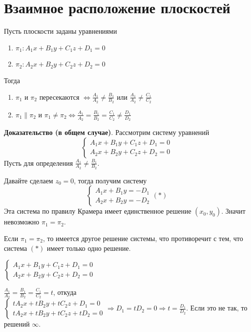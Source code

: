 \documentclass[a4paper]{article}
\begin{document}
\section*{Взаимное расположение плоскостей}
Пусть плоскости заданы уравнениями \begin{enumerate}
\item $\pi_1: A_1x+B_1y+C_1z+D_1 = 0$
\item $\pi_2: A_2x+B_2y+C_2z+D_2 = 0$
\end{enumerate}

Тогда\begin{enumerate}
\item $\pi_1$ и $\pi_2$ пересекаются $\displaystyle \Leftrightarrow \frac{A_1}{A_2} \neq \frac{B_1}{B_2}$ или $\displaystyle \frac{A_1}{A_2} \neq \frac{C_1}{C_2}$

\item $\pi_1 \parallel \pi_2$ и $\pi_1 \neq \pi_2 \Leftrightarrow \displaystyle \frac{A_1}{A_2} = \frac{B_1}{B_2} = \frac{C_1}{C_2} \neq \frac{D_1}{D_2}$
\end{enumerate}

\textbf{Доказательство (в общем случае)}. Рассмотрим систему уравнений
\begin{equation}
\begin{cases}
   A_1x+B_1y+C_1z+D_1 = 0
   \\
   A_2x+B_2y+C_2z+D_2 = 0
 \end{cases}
\end{equation}
Пусть для определения $\displaystyle \frac{A_1}{A_2} \neq \frac{B_1}{B_2}$.

Давайте сделаем $z_0=0$, тогда получим систему \begin{equation}
\begin{cases}
   A_1x+B_1y = -D_1
   \\
   A_2x+B_2y= -D_2
 \end{cases} (*)
\end{equation}
Эта система по правилу Крамера имеет единственное решение $(x_0, y_0)$. Значит невозможно $\pi_1 = \pi_2$.

Если $\pi_1 = \pi_2$, то имеется другое решение системы, что противоречит с тем, что система $(*)$ имеет только одно решение.

$\begin{cases}
   A_1x+B_1y+C_1z+D_1 = 0
   \\
   A_2x+B_2y+C_2z+D_2 = 0
 \end{cases}$
 
$\displaystyle \frac{A_1}{A_2} = \frac{B_1}{B_2} = \frac{C_1}{C_2} = t$, откуда $\begin{cases}
   tA_2x+tB_2y+tC_2z+D_1 = 0
   \\
   tA_2x+tB_2y+tC_2z+tD_2 = 0
 \end{cases} \Rightarrow D_1 = tD_2 = 0 \Rightarrow \displaystyle t = \frac{D_1}{D_2}$. Если это не так, то решений $\infty$.
 
\end{document}
